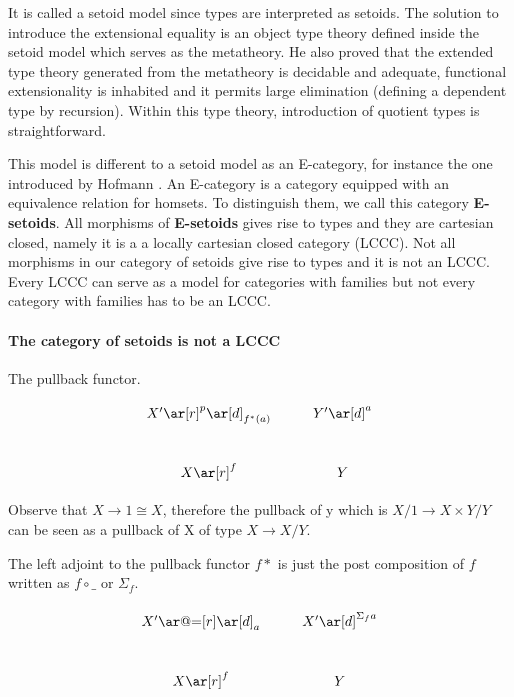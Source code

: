  It is called a setoid model since types are interpreted as setoids.
The solution to introduce the extensional equality is an object type theory defined inside the setoid model which serves as the metatheory. He also proved that the extended type theory generated from the metatheory is decidable and adequate, functional extensionality is
inhabited and it permits large elimination (defining a dependent type by recursion). Within this type theory,
introduction of quotient types is straightforward.

This model is different to a setoid model as an E-category, for instance
the one introduced by Hofmann \cite{hofmann1995interpretation} . An E-category is a category equipped with
an equivalence relation for homsets. To distinguish them, we call this
category \textbf{E-setoids}.  All morphisms of \textbf{E-setoids}
gives rise to types and they are cartesian closed, namely it is a a locally
cartesian closed category (LCCC). Not all morphisms in our category of setoids give
rise to types and it is not an LCCC. Every LCCC can serve as a model for categories with
families but not every category with families has to be an
LCCC. 




\paragraph{The category of setoids is not a LCCC}

The pullback functor.

\begin{displaymath}
    \xymatrix{X' \ar[r]^{p} \ar[d]_{f^{*}(a)} & Y' \ar[d]^a \\
      X \ar[r]^f& Y }
\end{displaymath}


Observe that $X \rightarrow 1 \cong X$, therefore the pullback of y which is
$X/1 \rightarrow X \times Y / Y$ can be seen as a pullback of X of type $X \rightarrow
X/Y$.

The left adjoint to the pullback functor $f*$ is just the post
composition of $f$ written as $f \circ\_$ or $\Sigma_f$.

\begin{displaymath}
    \xymatrix{X' \ar@{=}[r] \ar[d]_{a} & X' \ar[d]^{\Sigma_f a} \\
      X \ar[r]^f& Y }
\end{displaymath}


